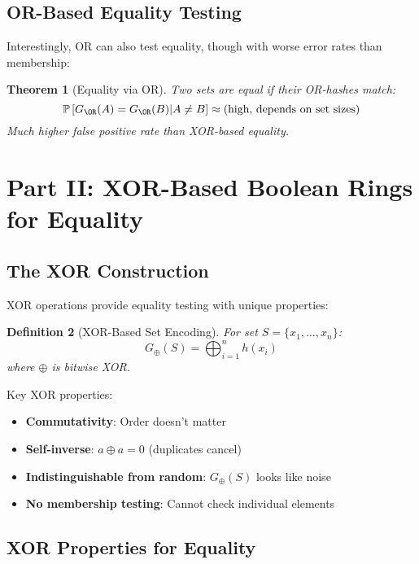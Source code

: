 \documentclass[11pt,final,hidelinks]{article}
\newcommand{\XOR}{\oplus}
\newtheorem{theorem}{Theorem}[section]
\newtheorem{definition}[theorem]{Definition}
\begin{document}
\subsection{OR-Based Equality Testing}

Interestingly, OR can also test equality, though with worse error rates than membership:

\begin{theorem}[Equality via OR]
Two sets are equal if their OR-hashes match:
\begin{equation}
\Prob{G_{\OR}(A) = G_{\OR}(B) | A \neq B} \approx \text{(high, depends on set sizes)}
\end{equation}
Much higher false positive rate than XOR-based equality.
\end{theorem}

\section{Part II: XOR-Based Boolean Rings for Equality}

\subsection{The XOR Construction}

XOR operations provide equality testing with unique properties:

\begin{definition}[XOR-Based Set Encoding]
For set $S = \{x_1, \ldots, x_n\}$:
\begin{equation}
G_{\XOR}(S) = \bigoplus_{i=1}^{n} h(x_i)
\end{equation}
where $\oplus$ is bitwise XOR.
\end{definition}

Key XOR properties:
\begin{itemize}
    \item \textbf{Commutativity}: Order doesn't matter
    \item \textbf{Self-inverse}: $a \oplus a = 0$ (duplicates cancel)
    \item \textbf{Indistinguishable from random}: $G_{\XOR}(S)$ looks like noise
    \item \textbf{No membership testing}: Cannot check individual elements
\end{itemize}

\subsection{XOR Properties for Equality}
\end{document}
